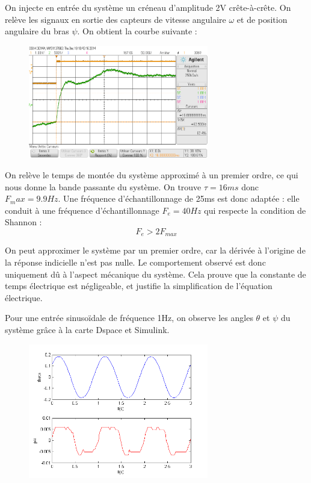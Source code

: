\documentclass[../../Cours_M1.tex]{subfiles}
\begin{document}
On injecte en entrée du système un créneau d'amplitude 2V crête-à-crête. On relève les signaux en sortie des capteurs de vitesse angulaire $\omega$ et de position angulaire du bras $\psi$. On obtient la courbe suivante :

\begin{figure}[h!]
\begin{center}
\includegraphics[width=0.7\textwidth]{tau.png}
\end{center}
\end{figure}

On relève le temps de montée du système approximé à un premier ordre, ce qui nous donne la bande passante du système. On trouve $\tau = 16 ms$ donc $F_max = 9.9Hz$. Une fréquence d'échantillonnage de 25ms est donc adaptée : elle conduit à une fréquence d'échantillonnage $F_e = 40Hz$ qui respecte la condition de Shannon : \[F_e > 2F_{max}\]

On peut approximer le système par un premier ordre, car la dérivée à l'origine de la réponse indicielle n'est pas nulle. Le comportement observé est donc uniquement dû à l'aspect mécanique du système. Cela prouve que la constante de temps électrique est négligeable, et justifie la simplification de l'équation électrique.

Pour une entrée sinusoïdale de fréquence 1Hz, on observe les angles $\theta$ et $\psi$ du système grâce à la carte Dspace et Simulink.

\begin{figure}
\begin{center}
\includegraphics[width=0.7\textwidth]{CAN.png}
\end{center}
\end{figure}
\end{document}
